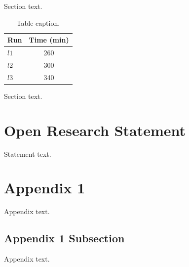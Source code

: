 \documentclass[
  draft
]{agujournal2025}
\begin{document}
Section text.



\begin{table}
\caption{Table caption.}
\centering
\begin{tabular}{l c}
    \hline
        Run  & Time (min)  \\
   \hline
      $l1$  & 260   \\
      $l2$  & 300   \\
      $l3$  & 340   \\
    \hline
\end{tabular}
\end{table}

Section text.


\section*{Open Research Statement}

Statement text.



%



\appendix  %

\section{Appendix 1}
Appendix text.

\subsection{Appendix 1 Subsection}
Appendix text.
\end{document}
